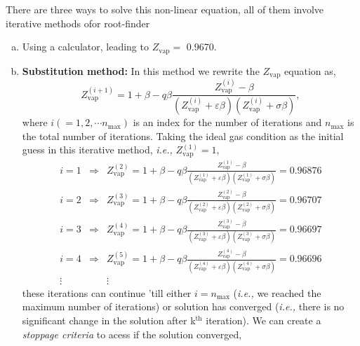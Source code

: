 \documentclass[12pts,a4paper,amsmath,amssymb,floatfix]{article}%
\newcommand{\frc}{\displaystyle\frac}
\newcommand{\ie}{{\it i.e., }}
\begin{document}
\begin{enumerate}[1)]
           There are three ways to solve this non-linear equation, all of them involve iterative methods ofor root-finder
           \begin{enumerate}[a)]
%
              \item Using a calculator, leading to $Z_{\text{vap}} = $ 0.9670. 
%
              \item {\bf Substitution method:} In this method we rewrite the $Z_{\text{vap}}$ equation as,
                 \begin{displaymath}
                     Z_{\text{vap}}^{(i+1)} = 1 + \beta - q\beta \frc{Z_{\text{vap}}^{(i)} - \beta} {\left(Z_{\text{vap}}^{(i)}+\varepsilon\beta\right)\left(Z_{\text{vap}}^{(i)} +\sigma\beta\right)},
                 \end{displaymath}
                 where $i(=1, 2, \cdots n_{\text{max}})$ is an index for the number of iterations and $n_{\text{max}}$ is the total number of iterations. Taking the ideal gas condition as the initial guess in this iterative method, \ie $Z_{\text{vap}}^{(1)}=1$, 
                 \begin{eqnarray}
                    i=1 &\Rightarrow& Z_{\text{vap}}^{(2)} = 1 + \beta - q\beta \frc{Z_{\text{vap}}^{(1)} - \beta} {\left(Z_{\text{vap}}^{(1)}+\varepsilon\beta\right)\left(Z_{\text{vap}}^{(1)} +\sigma\beta\right)} = 0.96876 \nonumber \\
                    i=2 &\Rightarrow& Z_{\text{vap}}^{(3)} = 1 + \beta - q\beta \frc{Z_{\text{vap}}^{(2)} - \beta} {\left(Z_{\text{vap}}^{(2)}+\varepsilon\beta\right)\left(Z_{\text{vap}}^{(2)} +\sigma\beta\right)} = 0.96707 \nonumber \\
                    i=3 &\Rightarrow& Z_{\text{vap}}^{(4)} = 1 + \beta - q\beta \frc{Z_{\text{vap}}^{(3)} - \beta} {\left(Z_{\text{vap}}^{(3)}+\varepsilon\beta\right)\left(Z_{\text{vap}}^{(3)} +\sigma\beta\right)} = 0.96697 \nonumber \\
                    i=4 &\Rightarrow& Z_{\text{vap}}^{(5)} = 1 + \beta - q\beta \frc{Z_{\text{vap}}^{(4)} - \beta} {\left(Z_{\text{vap}}^{(4)}+\varepsilon\beta\right)\left(Z_{\text{vap}}^{(4)} +\sigma\beta\right)} = 0.96696 \nonumber \\
                    \vdots && \vdots \nonumber
                 \end{eqnarray}
                 these iterations can continue 'till either $i=n_{\text{max}}$ (\ie we reached the maximum number of iterations) or solution has converged (\ie there is no significant change in the solution after k$^{\text{th}}$ iteration). We can create a {\it stoppage criteria} to acess if the solution converged,

\end{enumerate}
\end{enumerate}
\end{document}
